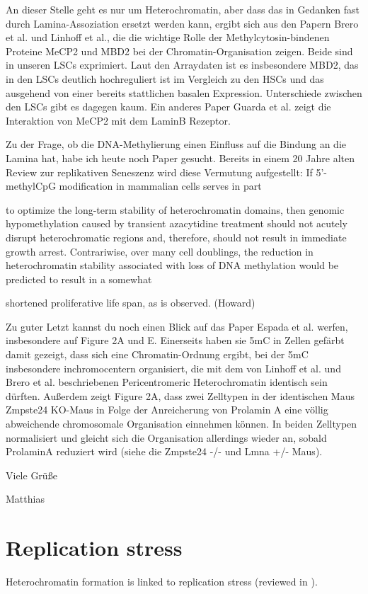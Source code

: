 An dieser Stelle geht es nur um Heterochromatin, aber dass das in Gedanken fast durch Lamina-Assoziation ersetzt werden kann, ergibt sich aus den Papern Brero et al. und Linhoff et al., die die wichtige Rolle der Methylcytosin-bindenen Proteine MeCP2 und MBD2 bei der Chromatin-Organisation zeigen. Beide sind in unseren LSCs exprimiert. Laut den Arraydaten ist es insbesondere MBD2, das in den LSCs deutlich hochreguliert ist im Vergleich zu den HSCs und das ausgehend von einer bereits stattlichen basalen Expression. Unterschiede zwischen den LSCs gibt es dagegen kaum. Ein anderes Paper Guarda et al. zeigt die Interaktion von MeCP2 mit dem LaminB Rezeptor. 


Zu der Frage, ob die DNA-Methylierung einen Einfluss auf die Bindung an die Lamina hat, habe ich heute noch Paper gesucht. Bereits in einem 20 Jahre alten Review zur replikativen Seneszenz wird diese Vermutung aufgestellt: If 5'-methylCpG modification in mammalian cells serves in part

to optimize the long-term stability of heterochromatin domains, then genomic hypomethylation caused by transient azacytidine treatment should not acutely disrupt heterochromatic regions and, therefore, should not result in immediate growth arrest. Contrariwise, over many cell doublings, the reduction in heterochromatin stability associated with loss of DNA methylation would be predicted to result in a somewhat

shortened proliferative life span, as is observed. (Howard)





Zu guter Letzt kannst du noch einen Blick auf das Paper Espada et al. werfen, insbesondere auf Figure 2A und E. Einerseits haben sie 5mC in Zellen gefärbt damit gezeigt, dass sich eine Chromatin-Ordnung ergibt, bei der 5mC insbesondere inchromocentern organisiert, die mit dem von Linhoff et al. und Brero et al. beschriebenen Pericentromeric Heterochromatin identisch sein dürften. Außerdem zeigt Figure 2A, dass zwei Zelltypen in der identischen Maus Zmpste24 KO-Maus in Folge der Anreicherung von Prolamin A eine völlig abweichende chromosomale Organisation einnehmen können. In beiden Zelltypen normalisiert und gleicht sich die Organisation allerdings wieder an, sobald ProlaminA reduziert wird (siehe die Zmpste24 -/- und Lmna +/- Maus).

Viele Grüße

Matthias

\section{Replication stress}
Heterochromatin formation is linked to replication stress (reviewed in \cite{Nikolov2016}).




